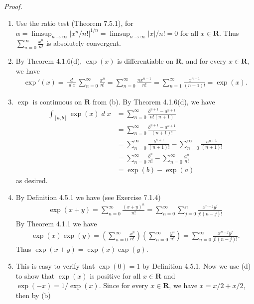 \documentclass{book}
\DeclareMathOperator{\dd}{\mathit{d}}%
\newcommand{\pff}{\vspace{.25em}\noindent\emph{Proof.}~~}
\newcounter{Exercise}[section]
\begin{document}
\pff
\begin{enumerate}
    \item Use the ratio test (Theorem 7.5.1), for $\alpha = \limsup_{n \to \infty} |x^n/n!|^{1/n} = \limsup_{n \to \infty} |x|/n! = 0$ for all $x \in \mathbf{R}$. Thus $\sum_{n = 0}^{\infty} \frac{x^n}{n!}$ is absolutely convergent.
    \item By Theorem 4.1.6(d), $\exp(x)$ is differentiable on $\mathbf{R}$, and for every $x \in \mathbf{R}$, we have
        \begin{align*}
            \exp'(x)
            = \frac{\dd}{\dd x} \sum_{n = 0}^{\infty} \frac{x^n}{n!}
            = \sum_{n = 0}^{\infty} \frac{nx^{n - 1}}{n!}
            = \sum_{n = 1}^{\infty} \frac{x^{n - 1}}{(n - 1)!}
            = \exp(x).
        \end{align*}
    \item $\exp$ is continuous on $\mathbf{R}$ from (b). By Theorem 4.1.6(d), we have
        \begin{align*}
            \int_{[a, b]} \exp(x) \dd x
            &= \sum_{n = 0}^{\infty} \frac{b^{n + 1} - a^{n + 1}}{n!(n + 1)}\\
            &= \sum_{n = 0}^{\infty} \frac{b^{n + 1} - a^{n + 1}}{(n + 1)!}\\
            &= \sum_{n = 0}^{\infty} \frac{b^{n + 1}}{(n + 1)!} - \sum_{n = 0}^{\infty} \frac{a^{n + 1}}{(n + 1)!}\\
            &= \sum_{n = 0}^{\infty} \frac{b^n}{n!} - \sum_{n = 0}^{\infty} \frac{a^n}{n!}\\
            &= \exp(b) - \exp(a)
        \end{align*}
    as desired.
    \item By Definition 4.5.1 we have (see Exercise 7.1.4)
        \begin{align*}
            \exp(x + y)
            = \sum_{n = 0}^{\infty} \frac{(x + y)^n}{n!}
            = \sum_{n = 0}^{\infty} \sum_{j = 0}^{n} \frac{x^{n - j}y^j}{j!(n - j)!}
        \end{align*}
    By Theorem 4.1.1 we have
        \begin{align*}
            \exp(x)\exp(y)
            = \left(\sum_{n = 0}^{\infty} \frac{x^n}{n!}\right) \left(\sum_{n = 0}^{\infty} \frac{y^n}{n!}\right)
            = \sum_{n = 0}^{\infty} \frac{x^{n - j}y^j}{j!(n - j)!}.
        \end{align*}
    Thus $\exp(x + y) = \exp(x)\exp(y)$.
    \item This is easy to verify that $\exp(0) = 1$ by Definition 4.5.1. Now we use (d) to show that $\exp(x)$ is positive for all $x \in \mathbf{R}$ and $\exp(-x) = 1/\exp(x)$. Since for every $x \in \mathbf{R}$, we have $x = x/2 + x/2$, then by (b)

\end{enumerate}
\end{document}
